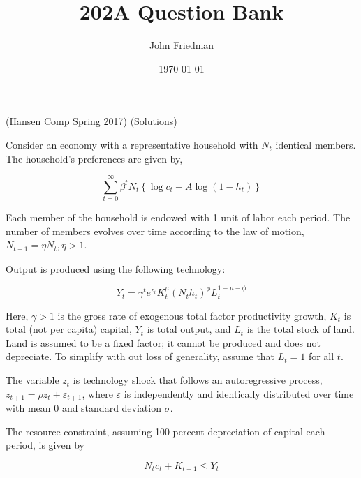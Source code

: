 \documentclass[answers]{exam}
\title{202A Question Bank}
\author{John Friedman}
\date{\today}
\begin{document}
\maketitle

\begin{questions}
    \question \href{http://economics.ucla.edu/wp-content/uploads/2016/10/MacroCompSpring2017.pdf}{(Hansen Comp Spring 2017)} \href{https://drive.google.com/drive/folders/11xTRC6EWE1VcPfk5BbXZRyGUX5oQ-jvo}{(Solutions)}


    Consider an economy with a representative household with $N_{t}$ identical members. The household's preferences are given by,

$$
\sum_{t=0}^{\infty} \beta^{t} N_{t}\left\{\log c_{t}+A \log \left(1-h_{t}\right)\right\}
$$

Each member of the household is endowed with 1 unit of labor each period. The number of members evolves over time according to the law of motion, $N_{t+1}=\eta N_{t}, \eta>1$.

Output is produced using the following technology:

$$
Y_{t}=\gamma^{t} e^{z_{t}} K_{t}^{\mu}\left(N_{t} h_{t}\right)^{\phi} L_{t}^{1-\mu-\phi}
$$

Here, $\gamma>1$ is the gross rate of exogenous total factor productivity growth, $K_{t}$ is total (not per capita) capital, $Y_{t}$ is total output, and $L_{t}$ is the total stock of land. Land is assumed to be a fixed factor; it cannot be produced and does not depreciate. To simplify with out loss of generality, assume that $L_{t}=1$ for all $t$.

The variable $z_{t}$ is technology shock that follows an autoregressive process, $z_{t+1}=\rho z_{t}+\varepsilon_{t+1}$, where $\varepsilon$ is independently and identically distributed over time with mean 0 and standard deviation $\sigma$.

The resource constraint, assuming 100 percent depreciation of capital each period, is given by

$$
N_{t} c_{t}+K_{t+1} \leq Y_{t}
$$


\end{questions}
\end{document}
